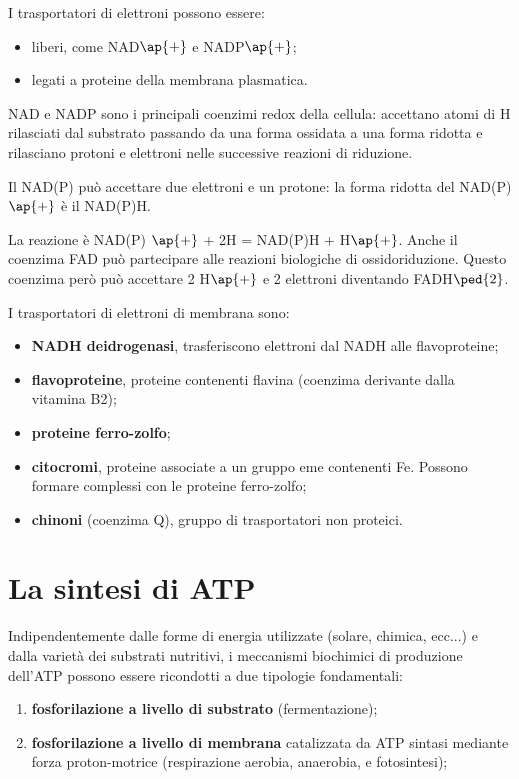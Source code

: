 \documentclass[11pt]{book}
\begin{document}
\vspace{1em}
I trasportatori di elettroni possono essere: 
\begin{itemize}
\item liberi, come NAD$\ap{+}$ e NADP$\ap{+}$;
\item legati a proteine della membrana plasmatica.
\end{itemize}

NAD e NADP sono i principali coenzimi redox della cellula: accettano atomi di H rilasciati dal substrato passando da una forma ossidata a una forma ridotta e rilasciano protoni e elettroni nelle successive reazioni di riduzione.

Il NAD(P) può accettare due elettroni e un protone: la forma ridotta del NAD(P)$\ap{+}$ è il NAD(P)H. 

La reazione è NAD(P) $\ap{+}$ + 2H = NAD(P)H + H$\ap{+}$.
Anche il coenzima FAD può partecipare alle reazioni biologiche di ossidoriduzione. Questo coenzima però può accettare 2 H$\ap{+}$ e 2 elettroni diventando FADH$\ped{2}$.

\vspace{1em}
I trasportatori di elettroni di membrana sono:
\begin{itemize}
\item \textbf{NADH deidrogenasi}, trasferiscono elettroni dal NADH alle flavoproteine;
\item \textbf{flavoproteine}, proteine contenenti flavina (coenzima derivante dalla vitamina B2);
\item \textbf{proteine ferro-zolfo};
\item \textbf{citocromi}, proteine associate a un gruppo eme contenenti Fe. Possono formare complessi con le proteine ferro-zolfo;
\item \textbf{chinoni} (coenzima Q), gruppo di trasportatori non proteici. 
\end{itemize}


\section{La sintesi di ATP}
Indipendentemente dalle forme di energia utilizzate (solare, chimica, ecc...) e dalla varietà dei substrati nutritivi, i meccanismi biochimici di produzione dell’ATP possono essere ricondotti a due tipologie fondamentali:
\begin{enumerate}
\item \textbf{fosforilazione a livello di substrato} (fermentazione); 
\item \textbf{fosforilazione a livello di membrana} catalizzata da ATP sintasi mediante forza proton-motrice (respirazione aerobia, anaerobia, e fotosintesi);
\end{enumerate}
\end{document}

